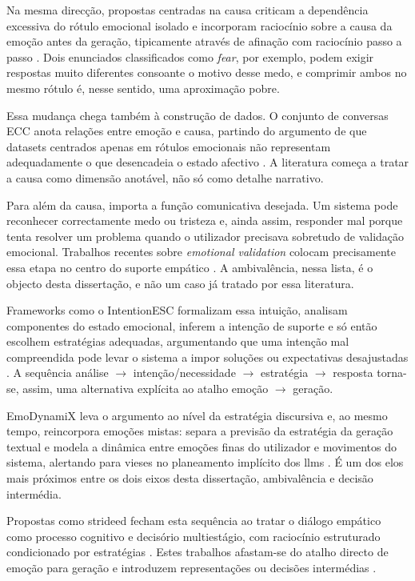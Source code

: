 Na mesma direcção, propostas centradas na causa criticam a dependência excessiva do rótulo emocional isolado e incorporam raciocínio sobre a causa da emoção antes da geração, tipicamente através de afinação com raciocínio passo a passo \parencite{Chen2024CauseAware}. Dois enunciados classificados como \textit{fear}, por exemplo, podem exigir respostas muito diferentes consoante o motivo desse medo, e comprimir ambos no mesmo rótulo é, nesse sentido, uma aproximação pobre.

Essa mudança chega também à construção de dados. O conjunto de conversas ECC anota relações entre emoção e causa, partindo do argumento de que datasets centrados apenas em rótulos emocionais não representam adequadamente o que desencadeia o estado afectivo \parencite{He2025ECC}. A literatura começa a tratar a causa como dimensão anotável, não só como detalhe narrativo.

Para além da causa, importa a função comunicativa desejada. Um sistema pode reconhecer correctamente medo ou tristeza e, ainda assim, responder mal porque tenta resolver um problema quando o utilizador precisava sobretudo de validação emocional. Trabalhos recentes sobre \textit{emotional validation} colocam precisamente essa etapa no centro do suporte empático \parencite{Son2026EmotionalValidation}. A ambivalência, nessa lista, é o objecto desta dissertação, e não um caso já tratado por essa literatura.

Frameworks como o IntentionESC formalizam essa intuição, analisam componentes do estado emocional, inferem a intenção de suporte e só então escolhem estratégias adequadas, argumentando que uma intenção mal compreendida pode levar o sistema a impor soluções ou expectativas desajustadas \parencite{Zhang2025IntentionESC}. A sequência análise \(\rightarrow\) intenção/necessidade \(\rightarrow\) estratégia \(\rightarrow\) resposta torna-se, assim, uma alternativa explícita ao atalho emoção \(\rightarrow\) geração.

EmoDynamiX leva o argumento ao nível da estratégia discursiva e, ao mesmo tempo, reincorpora emoções mistas: separa a previsão da estratégia da geração textual e modela a dinâmica entre emoções finas do utilizador e movimentos do sistema, alertando para vieses no planeamento implícito dos \glspl{llm} \parencite{Wan2025EmoDynamiX}. É um dos elos mais próximos entre os dois eixos desta dissertação, ambivalência e decisão intermédia.

Propostas como \gls{strideed} fecham esta sequência ao tratar o diálogo empático como processo cognitivo e decisório multiestágio, com raciocínio estruturado condicionado por estratégias \parencite{Ji2026STRIDEED}. Estes trabalhos afastam-se do atalho directo de emoção para geração e introduzem representações ou decisões intermédias \parencite{Fu2023ReasoningBeforeResponding, Chen2024CauseAware, Zhang2025IntentionESC, Ji2026STRIDEED}.

